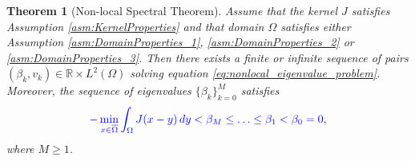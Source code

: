 \documentclass[12pt, a4paper]{article}
\newcommand{\revision}[1]{\textcolor{blue}{#1}}
\theoremstyle{break}
\newtheorem{thm}{Theorem}[section]
\theoremstyle{break}
\theoremstyle{break}
\theoremstyle{break}
\theoremstyle{break}
\theoremstyle{break}
\theoremstyle{break}
\theoremstyle{break}
\theoremstyle{break}
\begin{document}
\begin{thm}[Non-local Spectral Theorem]
    \label{thm:spectral_theorem}
    Assume that the kernel $J$ satisfies Assumption \ref{asm:KernelProperties} and that domain $\Omega$ satisfies either Assumption \ref{asm:DomainProperties_1}, \ref{asm:DomainProperties_2} or \ref{asm:DomainProperties_3}. Then there exists a finite or infinite sequence of pairs $(\beta_k, v_k) \in \mathbb{R} \times L^2(\Omega)$ solving equation \eqref{eq:nonlocal_eigenvalue_problem}. Moreover, the sequence of eigenvalues $\{\beta_k\}_{k = 0}^M$ satisfies
    \begin{equation}
        \revision{-\min_{x \in \overline{\Omega}} \int_\Omega J(x-y) \, dy < \beta_M \leq \ldots \leq \beta_1 < \beta_0 = 0,}
    \end{equation}
    where $M \geq 1$.
\end{thm}
\end{document}

